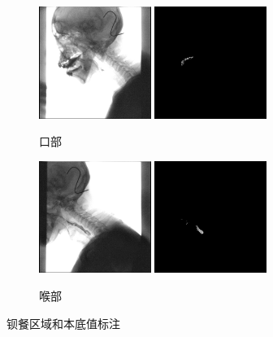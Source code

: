 \begin{figure}[!htp]
    \centering
    \begin{subfigure}{\textwidth}
        \centering
        \includegraphics[width=0.4\textwidth]{figures/3611.png}
        \includegraphics[width=0.4\textwidth]{figures/3612.png}
        \caption{口部}
    \end{subfigure}
    
    \begin{subfigure}{\textwidth}
        \centering
        \includegraphics[width=0.4\textwidth]{figures/3621.png}
        \includegraphics[width=0.4\textwidth]{figures/3622.png}
        \caption{喉部}
    \end{subfigure}
    \caption{钡餐区域和本底值标注}
    \label{fig:3_结果}
\end{figure}

